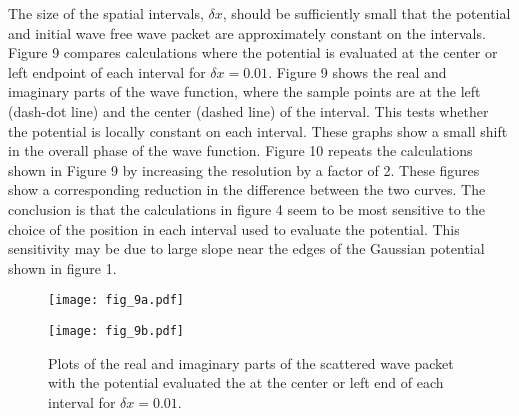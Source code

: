 \documentclass[aps,prc,reprint,noshowpacs,groupedaddress,onecolumn]{revtex4}
\begin{document}
The size of the spatial intervals, $\delta x$, should be sufficiently
small that the potential and initial wave free wave packet are
approximately constant on the intervals.  Figure 9 compares
calculations where the potential is evaluated at the center or left
endpoint of each interval for $\delta x=0.01$. Figure 9 shows the real
and imaginary parts of the wave function, where the sample points are at
the left
(dash-dot line) and the center (dashed line) of the interval.
This tests whether the potential is
locally constant on each interval.  These graphs show a small shift in
the overall phase of the wave function.  Figure 10 repeats the
calculations shown in Figure 9 by increasing the resolution
by a factor of 2.  These figures show a corresponding reduction in the
difference between the two curves.  The conclusion is that the
calculations in figure 4 seem to be most sensitive to the choice of
the position in each interval used to evaluate the potential.  This
sensitivity may be due to large slope
near the edges of the Gaussian potential shown in figure 1. 
\begin{figure}
\caption{Plots of the real and imaginary parts of the scattered wave packet
with the potential evaluated the at the center or left end of each
interval for $\delta x=0.01$. 
}
\begin{minipage}[t]{.45\linewidth} 
\centering
\texttt{[image: fig\_9a.pdf]}
\end{minipage}
\begin{minipage}[t]{.45\linewidth}
\centering
\texttt{[image: fig\_9b.pdf]}
\end{minipage}
\label{figure 9}
\end{figure}
 
\end{document}
